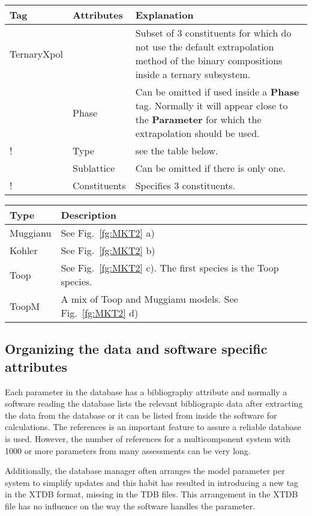 \documentclass{article}
\begin{document}
\begin{tabular}{|p{} p{} p{}|}\hline
  Tag & Attributes & Explanation\\\hline

  TernaryXpol & & Subset of 3 constituents for which do not use the default
              extrapolation method of the binary compositions inside
              a ternary subsystem.\\
       & Phase & Can be omitted if used inside a {\bf Phase} tag.  Normally  
              it will appear close to the {\bf Parameter} for which the
              extrapolation should be used.\\
!      & Type & see the table below.\\
       & Sublattice & Can be omitted if there is only one.\\
!      & Constituents & Specifies 3 constituents.\\\hline
\end{tabular}

\bigskip
\begin{tabular}{|p{} p{}|}\hline
Type     & Description \\\hline
Muggianu & See Fig.~\ref{fg:MKT2} a)\\
Kohler   & See Fig.~\ref{fg:MKT2} b)\\
Toop     & See Fig.~\ref{fg:MKT2} c).  The first species is the Toop species.\\
ToopM    & A mix of Toop and Muggianu models.  See Fig.~\ref{fg:MKT2} d)\\\hline
\end{tabular}

\subsection{Organizing the data and software specific attributes}\label{sec:subsys}\label{sec:soft}\label{sec:last}

Each parameter in the database has a bibliography attribute and
normally a software reading the database lists the relevant
bibliograpic data after extracting the data from the database or it
can be listed from inside the software for calculations.  The
references is an important feature to assure a reliable database is
used.  However, the number of references for a multicomponent system
with 1000 or more parameters from many assessments can be very long.

Additionally, the database manager often arranges the model parameter
per system to simplify updates and this habit has resulted in
introducing a new tag in the XTDB format, missing in the TDB files.
This arrangement in the XTDB file has no influence on the way the
software handles the parameter.
\end{document}
